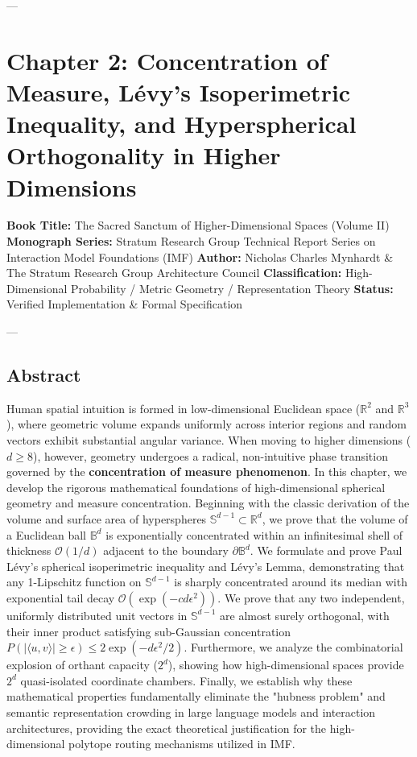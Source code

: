 \documentclass[11pt,twoside,openright]{amsbook}
\begin{document}
---

\chapter{Chapter 2: Concentration of Measure, Lévy's Isoperimetric Inequality, and Hyperspherical Orthogonality in Higher Dimensions}

\textbf{Book Title:} The Sacred Sanctum of Higher-Dimensional Spaces (Volume II)  
\textbf{Monograph Series:} Stratum Research Group Technical Report Series on Interaction Model Foundations (IMF)  
\textbf{Author:} Nicholas Charles Mynhardt & The Stratum Research Group Architecture Council  
\textbf{Classification:} High-Dimensional Probability / Metric Geometry / Representation Theory  
\textbf{Status:} Verified Implementation & Formal Specification  

---

\section{Abstract}

Human spatial intuition is formed in low-dimensional Euclidean space ($\mathbb{R}^2$ and $\mathbb{R}^3$), where geometric volume expands uniformly across interior regions and random vectors exhibit substantial angular variance. When moving to higher dimensions ($d \ge 8$), however, geometry undergoes a radical, non-intuitive phase transition governed by the \textbf{concentration of measure phenomenon}. In this chapter, we develop the rigorous mathematical foundations of high-dimensional spherical geometry and measure concentration. Beginning with the classic derivation of the volume and surface area of hyperspheres $\mathbb{S}^{d-1} \subset \mathbb{R}^d$, we prove that the volume of a Euclidean ball $\mathbb{B}^d$ is exponentially concentrated within an infinitesimal shell of thickness $\mathcal{O}(1/d)$ adjacent to the boundary $\partial \mathbb{B}^d$. We formulate and prove Paul Lévy's spherical isoperimetric inequality and Lévy's Lemma, demonstrating that any 1-Lipschitz function on $\mathbb{S}^{d-1}$ is sharply concentrated around its median with exponential tail decay $\mathcal{O}(\exp(-c d \epsilon^2))$. We prove that any two independent, uniformly distributed unit vectors in $\mathbb{S}^{d-1}$ are almost surely orthogonal, with their inner product satisfying sub-Gaussian concentration $P(|\langle u, v \rangle| \ge \epsilon) \le 2\exp(-d \epsilon^2 / 2)$. Furthermore, we analyze the combinatorial explosion of orthant capacity ($2^d$), showing how high-dimensional spaces provide $2^d$ quasi-isolated coordinate chambers. Finally, we establish why these mathematical properties fundamentally eliminate the "hubness problem" and semantic representation crowding in large language models and interaction architectures, providing the exact theoretical justification for the high-dimensional polytope routing mechanisms utilized in IMF.
\end{document}
